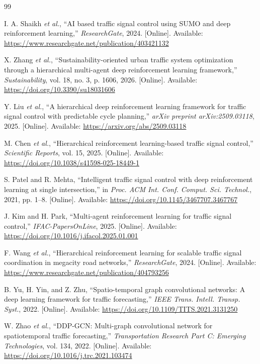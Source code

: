 \documentclass[conference]{IEEEtran}
\begin{document}
\begin{thebibliography}{99}

I. A. Shaikh \textit{et al.},
``AI based traffic signal control using SUMO and deep reinforcement learning,''
\textit{ResearchGate}, 2024.
[Online]. Available: \url{https://www.researchgate.net/publication/403421132}

X. Zhang \textit{et al.},
``Sustainability-oriented urban traffic system optimization through a
hierarchical multi-agent deep reinforcement learning framework,''
\textit{Sustainability}, vol. 18, no. 3, p. 1606, 2026.
[Online]. Available: \url{https://doi.org/10.3390/su18031606}

Y. Liu \textit{et al.},
``A hierarchical deep reinforcement learning framework for traffic signal
control with predictable cycle planning,''
\textit{arXiv preprint arXiv:2509.03118}, 2025.
[Online]. Available: \url{https://arxiv.org/abs/2509.03118}

M. Chen \textit{et al.},
``Hierarchical reinforcement learning-based traffic signal control,''
\textit{Scientific Reports}, vol. 15, 2025.
[Online]. Available: \url{https://doi.org/10.1038/s41598-025-18449-1}

S. Patel and R. Mehta,
``Intelligent traffic signal control with deep reinforcement learning at
single intersection,''
in \textit{Proc. ACM Int. Conf. Comput. Sci. Technol.}, 2021, pp. 1--8.
[Online]. Available: \url{https://doi.org/10.1145/3467707.3467767}

J. Kim and H. Park,
``Multi-agent reinforcement learning for traffic signal control,''
\textit{IFAC-PapersOnLine}, 2025.
[Online]. Available: \url{https://doi.org/10.1016/j.ifacol.2025.01.001}

F. Wang \textit{et al.},
``Hierarchical reinforcement learning for scalable traffic signal coordination
in megacity road networks,''
\textit{ResearchGate}, 2024.
[Online]. Available: \url{https://www.researchgate.net/publication/404793256}

B. Yu, H. Yin, and Z. Zhu,
``Spatio-temporal graph convolutional networks: A deep learning framework
for traffic forecasting,''
\textit{IEEE Trans. Intell. Transp. Syst.}, 2022.
[Online]. Available: \url{https://doi.org/10.1109/TITS.2021.3131250}

W. Zhao \textit{et al.},
``DDP-GCN: Multi-graph convolutional network for spatiotemporal traffic
forecasting,''
\textit{Transportation Research Part C: Emerging Technologies},
vol. 134, 2022.
[Online]. Available: \url{https://doi.org/10.1016/j.trc.2021.103474}


\end{thebibliography}
\end{document}
